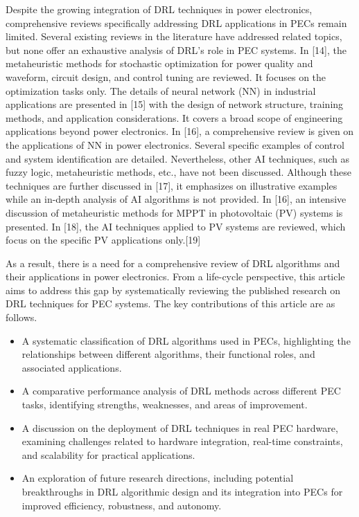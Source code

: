 \documentclass[lettersize,journal]{IEEEtran}
\begin{document}
Despite the growing integration of DRL techniques in power electronics, comprehensive reviews specifically addressing DRL applications in PECs remain limited. Several existing reviews in the literature have addressed related topics, but none offer an exhaustive analysis of DRL's role in PEC systems. In [14], the metaheuristic methods for stochastic optimization for power quality and waveform, circuit design, and control tuning are reviewed. It focuses on the optimization tasks only. The details of neural network (NN) in industrial applications are presented in [15] with the design of network structure, training methods, and application considerations. It covers a broad scope of engineering applications beyond power electronics. In [16], a comprehensive review is given on the applications of NN in power electronics. Several specific examples of control and system identification are detailed. Nevertheless, other AI techniques, such as fuzzy logic, metaheuristic methods, etc., have not been discussed. Although these techniques are further discussed in [17], it emphasizes on illustrative examples while an in-depth analysis of AI algorithms is not provided. In [16], an intensive discussion of metaheuristic methods for MPPT in photovoltaic (PV) systems is presented. In [18], the AI techniques applied to PV systems are reviewed, which focus on the specific PV applications only.[19]

As a result, there is a need for a comprehensive review of DRL algorithms and their applications in power electronics. From a life-cycle perspective, this article aims to address this gap by systematically reviewing the published research on DRL techniques for PEC systems. The key contributions of this article are as follows.
\begin{itemize}
  \item [1)]A systematic classification of DRL algorithms used in PECs, highlighting the relationships between different algorithms, their functional roles, and associated applications.
  \item [2)]A comparative performance analysis of DRL methods across different PEC tasks, identifying strengths, weaknesses, and areas of improvement.
  \item [3)]A discussion on the deployment of DRL techniques in real PEC hardware, examining challenges related to hardware integration, real-time constraints, and scalability for practical applications.
  \item [4)]An exploration of future research directions, including potential breakthroughs in DRL algorithmic design and its integration into PECs for improved efficiency, robustness, and autonomy.
\end{itemize}
\end{document}
